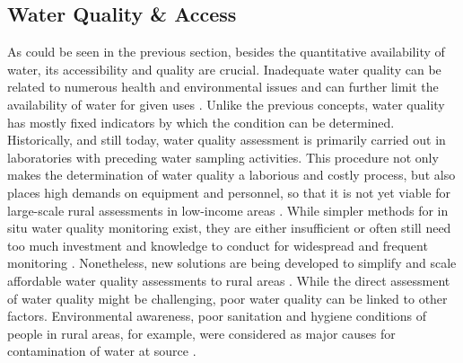 
\subsection{Water Quality \& Access}\label{subsec:water_quality}

As could be seen in the previous section, besides the quantitative availability of water, its accessibility and quality are crucial. Inadequate water quality can be related to numerous health and environmental issues and can further limit the availability of water for given uses \autocite{rcrcFORECASTBASEDFINANCINGEARLY2020, faoCopingWaterScarcity2012}. Unlike the previous concepts, water quality has mostly fixed indicators by which the condition can be determined. Historically, and still today, water quality assessment is primarily carried out in laboratories with preceding water sampling activities. This procedure not only makes the determination of water quality a laborious and costly process, but also places high demands on equipment and personnel, so that it is not yet viable for large-scale rural assessments in low-income areas \autocite{tariqOpenSourceWater2021,wmoPlanningWaterqualityMonitoring2013}. While simpler methods for in situ water quality monitoring exist, they are either insufficient or often still need too much investment and knowledge to conduct for widespread and frequent monitoring \autocite{wmoPlanningWaterqualityMonitoring2013}. Nonetheless, new solutions are being developed to simplify and scale affordable water quality assessments to rural areas \autocite{ighaloComprehensiveReviewWater2020,tariqOpenSourceWater2021}. While the direct assessment of water quality might be challenging, poor water quality can be linked to other factors. Environmental awareness, poor sanitation and hygiene conditions of people in rural areas, for example, were considered as major causes for contamination of water at source \autocite{zamxakaMicrobiologicalPhysicochemicalAssessment2004}.


